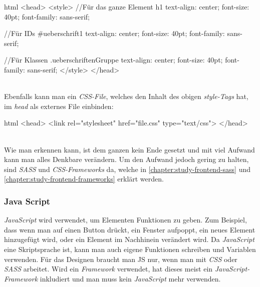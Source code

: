 		\begin{code}{html}
				<head>
					<style>
					//Für das ganze Element
					h1 {
						text-align: center; 
						font-size: 40pt; 
						font-family: sans-serif;
					}
				
					//Für IDs
					#ueberschrift1 {
						text-align: center; 
						font-size: 40pt; 
						font-family: sans-serif;
					}
					
					//Für Klassen
					.ueberschriftenGruppe {
						text-align: center; 
						font-size: 40pt; 
						font-family: sans-serif;
					}
					</style>
				</head>
		\end{code}
	\label{list:cssbsp} ~\\
		Ebenfalls kann man ein \textit{CSS-File}, welches den Inhalt des obigen \textit{style-Tags} hat, im \textit{head} als externes File einbinden:
		\begin{code}{html}
			<head>
				<link rel="stylesheet" href="file.css" type="text/css">
			</head>
		\end{code}
	\label{list:csslink} ~\\
		Wie man erkennen kann, ist dem ganzen kein Ende gesetzt und mit viel Aufwand kann man alles Denkbare verändern. Um den Aufwand jedoch gering zu halten, sind \textit{SASS} und \textit{CSS-Frameworks} da, welche in \autoref{chapter:study-frontend-sass} und \autoref{chapter:study-frontend-frameworks} erklärt werden.
		\subsubsection{Java Script}
		\label{chapter:study-frontend-js}
		\textit{JavaScript} wird verwendet, um Elementen Funktionen zu geben. Zum Beispiel, dass wenn man auf einen Button drückt, ein Fenster aufpoppt, ein neues Element hinzugefügt wird, oder ein Element im Nachhinein verändert wird. Da \textit{JavaScript} eine Skriptsprache ist, kann man auch eigene Funktionen schreiben und Variablen verwenden. Für das Designen braucht man JS nur, wenn man mit \textit{CSS} oder \textit{SASS} arbeitet. Wird ein \textit{Framework} verwendet, hat dieses meist ein \textit{JavaScript-Framework} inkludiert und man muss kein \textit{JavaScript} mehr verwenden.
